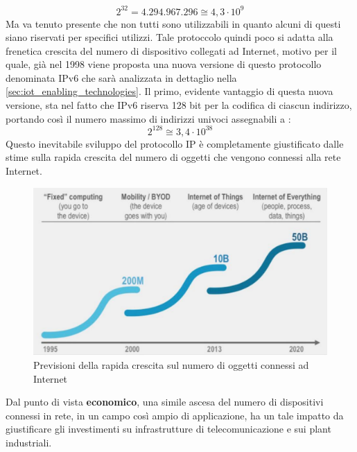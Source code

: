 \begin{equation}
2^{32} = 4.294.967.296 \cong 4,3 \cdot 10^9
\end{equation}
Ma va tenuto presente che non tutti sono utilizzabili in quanto alcuni di questi siano riservati per specifici utilizzi.
Tale protoccolo quindi poco si adatta alla frenetica crescita del numero di dispositivo collegati ad Internet, motivo per il quale, già nel 1998 viene proposta una nuova versione di questo protocollo denominata IPv6 che sarà analizzata in dettaglio nella \autoref{sec:iot_enabling_technologies}. Il primo, evidente vantaggio di questa nuova versione, sta nel fatto che IPv6 riserva 128 bit per la codifica di ciascun indirizzo, portando così il numero massimo di indirizzi univoci assegnabili a \cite{book:ref_book_1}:
\begin{equation}
2^{128} \cong 3,4 \cdot 10^{38}
\end{equation}
Questo inevitabile sviluppo del protocollo IP è completamente giustificato dalle stime sulla rapida crescita del numero di oggetti che vengono connessi alla rete Internet.\\
\begin{figure}
	\begin{center}
		\includegraphics[width=0.9\columnwidth]{images/numbers_devices.png}
	\end{center}
	\caption{Previsioni della rapida crescita sul numero di oggetti connessi ad Internet \cite{famous:paper_cisco_2013}}
	\label{fig:numbers_devices}
\end{figure}
Dal punto di vista \textbf{economico}, una simile ascesa del numero di dispositivi connessi in rete, in un campo così ampio di applicazione, ha un tale impatto da giustificare gli investimenti su infrastrutture di telecomunicazione e sui plant industriali. 
